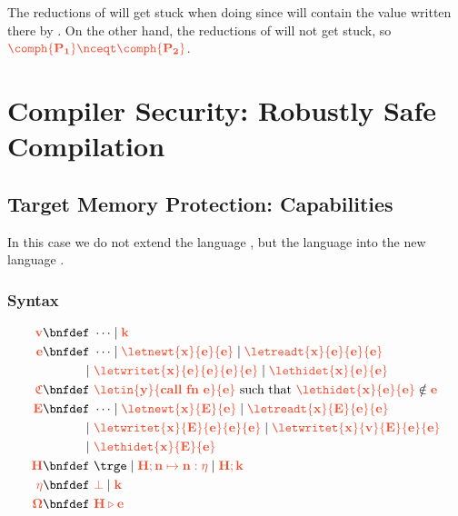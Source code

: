 \documentclass{article}
\theoremstyle{definition}
\begin{document}
The reductions of  will get stuck when doing  since  will contain the \trg{\truev} value written there by .
On the other hand, the reductions of  will not get stuck, so $\trg{\comph{P_1}\nceqt\comph{P_2}}$.





\section{Compiler Security: Robustly Safe Compilation}

\subsection{Target Memory Protection: Capabilities \Tcaps}
In this case we do not extend the language \Th, but the language \To into the new language \Tcaps.
\subsubsection{Syntax}
\begin{align*}
	\trg{v}\bnfdef&\ 
		\cdots \mid \trg{k}
	\\
	\trg{e} \bnfdef&\ 
		\cdots \mid \trg{\letnewt{x}{e}{e}} \mid \trg{\letreadt{x}{e}{e}{e}}
	\\
	\mid&\
		 \trg{\letwritet{x}{e}{e}{e}{e}} \mid \trg{\lethidet{x}{e}{e}}
	\\
	\trg{\ctx} \bnfdef&\
		\trg{
			\letin{y}{call~fn~e}{e}
		} 
		\text{ such that } \trg{\lethidet{x}{e}{e}}\notin \trg{e}
	\\
	\trg{E} \bnfdef&\
		\cdots \mid \trg{\letnewt{x}{E}{e}} \mid \trg{\letreadt{x}{E}{e}{e}}
	\\
	\mid&\ 
		\trg{\letwritet{x}{E}{e}{e}{e}} \mid \trg{\letwritet{x}{v}{E}{e}{e}} 
	\\
	\mid&\ 
		\trg{\lethidet{x}{E}{e}}
	\\
	\trg{H} \bnfdef&\
		\trge \mid \trg{H;n\mapsto n : \eta} \mid \trg{H;k}
	\\
	\trg{\eta} \bnfdef&\
		\trg{\bot} \mid \trg{k}
	\\
	\trg{\Omega} \bnfdef&\
		\trg{H\triangleright e}
\end{align*}
\end{document}
